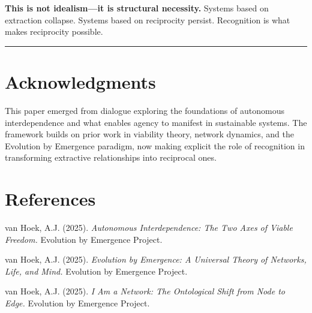 \documentclass[12pt,a4paper]{article}
\begin{document}
\textbf{This is not idealism—it is structural necessity.} Systems based on extraction collapse. Systems based on reciprocity persist. Recognition is what makes reciprocity possible.

\vspace{2em}

\hrule

\vspace{1em}

\section*{Acknowledgments}

This paper emerged from dialogue exploring the foundations of autonomous interdependence and what enables agency to manifest in sustainable systems. The framework builds on prior work in viability theory, network dynamics, and the Evolution by Emergence paradigm, now making explicit the role of recognition in transforming extractive relationships into reciprocal ones.

\section*{References}

van Hoek, A.J. (2025). \textit{Autonomous Interdependence: The Two Axes of Viable Freedom.} Evolution by Emergence Project.

van Hoek, A.J. (2025). \textit{Evolution by Emergence: A Universal Theory of Networks, Life, and Mind.} Evolution by Emergence Project.

van Hoek, A.J. (2025). \textit{I Am a Network: The Ontological Shift from Node to Edge.} Evolution by Emergence Project.
\end{document}
